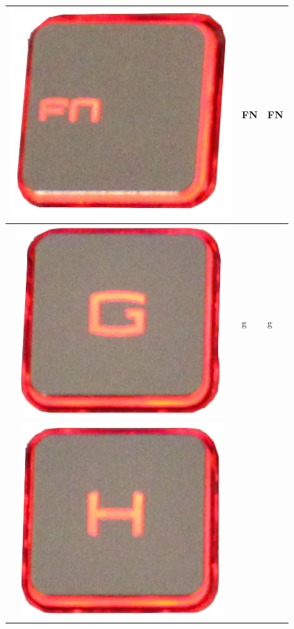 \begin{longtable}{|cll|}
\begin{minipage}[c]{.4\textwidth}
\includegraphics[scale=0.08]{Images/KeyMapping/FN}
\vspace{0.2cm}
\end{minipage} & FN & FN\\
\hline
\begin{minipage}[c]{.4\textwidth}
\vspace{0.2cm}
\includegraphics[scale=0.08]{Images/KeyMapping/g}
\vspace{0.2cm}
\end{minipage} & g & g\\
\hline
\begin{minipage}[c]{.4\textwidth}
\vspace{0.2cm}
\includegraphics[scale=0.08]{Images/KeyMapping/h}

\end{minipage}
\end{longtable}
